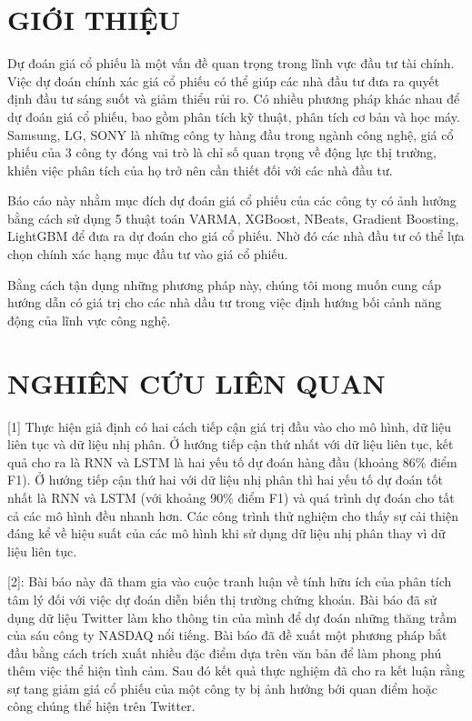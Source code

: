 \documentclass{article}
\begin{document}
\begin{multicols}{2}

\section{GIỚI THIỆU}

Dự đoán giá cổ phiếu là một vấn đề quan trọng trong lĩnh vực đầu tư tài chính. Việc dự đoán chính xác giá cổ phiếu có thể giúp các nhà đầu tư đưa ra quyết định đầu tư sáng suốt và giảm thiểu rủi ro. Có nhiều phương pháp khác nhau để dự đoán giá cổ phiếu, bao gồm phân tích kỹ thuật, phân tích cơ bản và học máy. Samsung, LG, SONY là những công ty hàng đầu trong ngành công nghệ, giá cổ phiếu của 3 công ty đóng vai trò là chỉ số quan trọng về động lực thị trường, khiến việc phân tích của họ trở nên cần thiết đối với các nhà đầu tư. 

Báo cáo này nhằm mục đích dự đoán giá cổ phiếu của các công ty có ảnh hưởng bằng cách sử dụng 5 thuật toán VARMA, XGBoost, NBeats, Gradient Boosting, LightGBM để đưa ra dự đoán cho giá cổ phiếu. Nhờ đó các nhà đầu tư có thể lựa chọn chính xác hạng mục đầu tư vào giá cổ phiếu. 

Bằng cách tận dụng những phương pháp này, chúng tôi mong muốn cung cấp hướng dẫn có giá trị cho các nhà dầu tư trong việc định hướng bối cảnh năng động của lĩnh vực công nghệ. 


\section{NGHIÊN CỨU LIÊN QUAN}


[1] Thực hiện giả định có hai cách tiếp cận giá trị đầu vào cho mô hình, dữ liệu liên tục và dữ liệu nhị phân. Ở hướng tiếp cận thứ nhất với dữ liệu liên tục, kết quả cho ra là RNN và LSTM là hai yếu tố dự đoán hàng đầu (khoảng 86\% điểm F1). Ở hướng tiếp cận thứ hai với dữ liệu nhị phân thì hai yếu tố dự đoán tốt nhất là RNN và LSTM (với khoảng 90\% điểm F1) và quá trình dự đoán cho tất cả các mô hình đều nhanh hơn. Các công trình thử nghiệm cho thấy sự cải thiện đáng kể về hiệu suất của các mô hình khi sử dụng dữ liệu nhị phân thay vì dữ liệu liên tục.

[2]: Bài báo này đã tham gia vào cuộc tranh luận về tính hữu ích của phân tích tâm lý đối với việc dự đoán diễn biến thị trường chứng khoán. Bài báo đã sử dụng dữ liệu Twitter làm kho thông tin của mình để dự đoán những thăng trầm của sáu công ty NASDAQ nổi tiếng. Bài báo đã đề xuất một phương pháp bắt đầu bằng cách trích xuất nhiều đặc điểm dựa trên văn bản để làm phong phú thêm việc thể hiện tình cảm. Sau đó kết quả thực nghiệm đã cho ra kết luận rằng sự tang giảm giá cổ phiếu của một công ty bị ảnh hưởng bới quan điểm hoặc công chúng thể hiện trên Twitter.


\end{multicols}
\end{document}
